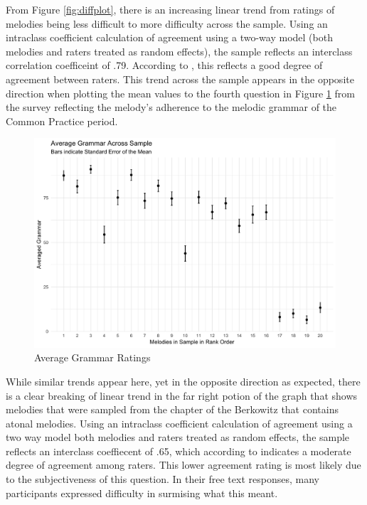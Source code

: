 \documentclass[]{book}
\begin{document}
From Figure \ref{fig:diffplot}, there is an increasing linear trend from ratings of melodies being less difficult to more difficulty across the sample.
Using an intraclass coefficient calculation of agreement using a two-way model (both melodies and raters treated as random effects), the sample reflects an interclass correlation coefficeint of .79.
According to \citet{kooGuidelineSelectingReporting2016}, this reflects a good degree of agreement between raters.
This trend across the sample appears in the opposite direction when plotting the mean values to the fourth question in Figure \ref{fig:grammarplot} from the survey reflecting the melody's adherence to the melodic grammar of the Common Practice period.

\begin{figure}

{\centering \includegraphics[width=0.8\linewidth]{img/grammar_plot} 

}

\caption{Average Grammar Ratings}\label{fig:grammarplot}
\end{figure}

While similar trends appear here, yet in the opposite direction as expected, there is a clear breaking of linear trend in the far right potion of the graph that shows melodies that were sampled from the chapter of the Berkowitz that contains atonal melodies.
Using an intraclass coefficient calculation of agreement using a two way model both melodies and raters treated as random effects, the sample reflects an interclass coeffiecent of .65, which according to \citet{kooGuidelineSelectingReporting2016} indicates a moderate degree of agreement among raters.
This lower agreement rating is most likely due to the subjectiveness of this question.
In their free text responses, many participants expressed difficulty in surmising what this meant.
\end{document}

